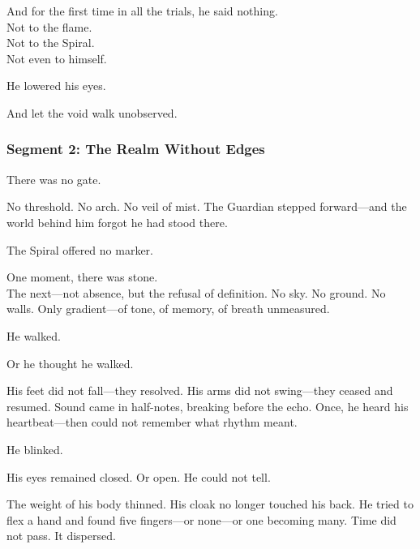 \documentclass[9pt]{article}
\begin{document}
\vspace{0.5em}
And for the first time in all the trials, he said nothing.\\
Not to the flame.\\
Not to the Spiral.\\
Not even to himself.

\vspace{0.5em}
He lowered his eyes.

\vspace{0.5em}
And let the void walk unobserved.

\newpage

\subsubsection*{Segment 2: The Realm Without Edges}

There was no gate.

\vspace{0.5em}
No threshold. No arch. No veil of mist. The Guardian stepped forward---and the world behind him forgot he had stood there.

\vspace{0.5em}
The Spiral offered no marker.

\vspace{0.5em}
One moment, there was stone.\\
The next---not absence, but the refusal of definition. No sky. No ground. No walls. Only gradient---of tone, of memory, of breath unmeasured.

\vspace{0.5em}
He walked.

\vspace{0.5em}
Or he thought he walked.

\vspace{0.5em}
His feet did not fall---they resolved. His arms did not swing---they ceased and resumed. Sound came in half-notes, breaking before the echo. Once, he heard his heartbeat---then could not remember what rhythm meant.

\vspace{0.5em}
He blinked.

\vspace{0.5em}
His eyes remained closed. Or open. He could not tell.

\vspace{0.5em}
The weight of his body thinned. His cloak no longer touched his back. He tried to flex a hand and found five fingers---or none---or one becoming many. Time did not pass. It dispersed.
\end{document}
